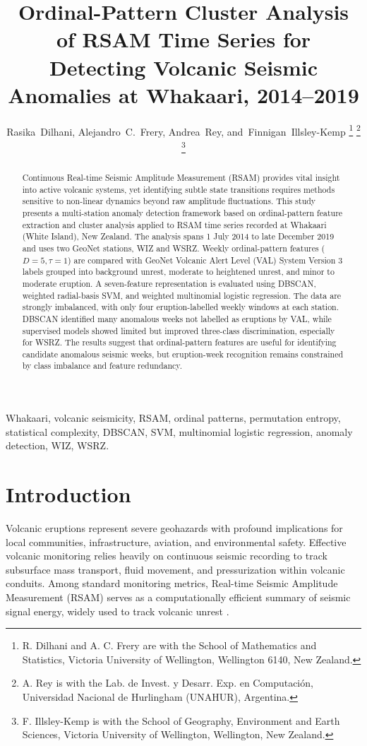 \documentclass[journal]{IEEEtran}
\title{Ordinal-Pattern Cluster Analysis of RSAM Time Series for Detecting Volcanic Seismic Anomalies at Whakaari, 2014--2019}
\author{Rasika~Dilhani, Alejandro~C.~Frery, Andrea~Rey, and~Finnigan~Illsley-Kemp
\thanks{R. Dilhani and A. C. Frery are with the School of Mathematics and Statistics, Victoria University of Wellington, Wellington 6140, New Zealand.}
\thanks{A. Rey is with the Lab. de Invest. y Desarr. Exp. en Computación, Universidad Nacional de Hurlingham (UNAHUR), Argentina.}
\thanks{F. Illsley-Kemp is with the School of Geography, Environment and Earth Sciences, Victoria University of Wellington, Wellington, New Zealand.}
}
\begin{document}
\maketitle

\begin{abstract}
Continuous Real-time Seismic Amplitude Measurement (RSAM) provides vital insight into active volcanic systems, yet identifying subtle state transitions requires methods sensitive to non-linear dynamics beyond raw amplitude fluctuations. This study presents a multi-station anomaly detection framework based on ordinal-pattern feature extraction and cluster analysis applied to RSAM time series recorded at Whakaari (White Island), New Zealand. The analysis spans 1 July 2014 to late December 2019 and uses two GeoNet stations, WIZ and WSRZ. Weekly ordinal-pattern features ($D=5, \tau=1$) are compared with GeoNet Volcanic Alert Level (VAL) System Version 3 labels grouped into background unrest, moderate to heightened unrest, and minor to moderate eruption. A seven-feature representation is evaluated using DBSCAN, weighted radial-basis SVM, and weighted multinomial logistic regression. The data are strongly imbalanced, with only four eruption-labelled weekly windows at each station. DBSCAN identified many anomalous weeks not labelled as eruptions by VAL, while supervised models showed limited but improved three-class discrimination, especially for WSRZ. The results suggest that ordinal-pattern features are useful for identifying candidate anomalous seismic weeks, but eruption-week recognition remains constrained by class imbalance and feature redundancy.
\end{abstract}

\begin{IEEEkeywords}
Whakaari, volcanic seismicity, RSAM, ordinal patterns, permutation entropy, statistical complexity, DBSCAN, SVM, multinomial logistic regression, anomaly detection, WIZ, WSRZ.
\end{IEEEkeywords}

\section{Introduction}
Volcanic eruptions represent severe geohazards with profound implications for local communities, infrastructure, aviation, and environmental safety. Effective volcanic monitoring relies heavily on continuous seismic recording to track subsurface mass transport, fluid movement, and pressurization within volcanic conduits. Among standard monitoring metrics, Real-time Seismic Amplitude Measurement (RSAM) serves as a computationally efficient summary of seismic signal energy, widely used to track volcanic unrest \cite{endo1991real}.
\end{document}
